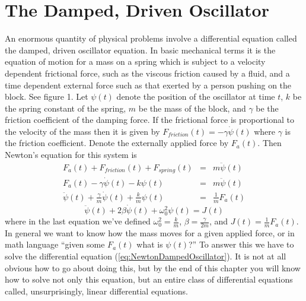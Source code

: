 \section{The Damped, Driven Oscillator}
An enormous quantity of physical problems involve a differential equation called the damped, driven oscillator equation.  In basic mechanical terms it is the equation of motion for a mass on a spring which is subject to a velocity dependent frictional force, such as the viscous friction caused by a fluid, and a time dependent external force such as that exerted by a person pushing on the block.  See figure 1.  Let $\psi(t)$ denote the position of the oscillator at time $t$, $k$ be the spring constant of the spring, $m$ be the mass of the block, and $\gamma$ be the friction coefficient of the damping force.  If the frictional force is proportional to the velocity of the mass then it is given by $F_{friction}(t) = -\gamma \dot{\psi}(t)$ where $\gamma$ is the friction coefficient.  Denote the externally applied force by $F_a(t)$.  Then Newton's equation for this system is
\begin{eqnarray*}
F_a(t) + F_{friction}(t) + F_{spring}(t) &=& m \ddot{\psi}(t)\\
F_a(t) - \gamma \dot{\psi}(t) - k\psi (t) &=& m \ddot{\psi}(t)\\
\ddot{\psi}(t) + \frac{\gamma}{m}\dot{\psi}(t) + \frac{k}{m}\psi (t) &=& \frac{1}{m}F_a(t)
\end{eqnarray*}
\begin{equation}\label{eq:NewtonDampedOscillator}
\ddot{\psi}(t) + 2\beta\dot{\psi}(t) + \omega ^2_0 \psi(t) = J(t)
\end{equation}
where in the last equation we've defined $\omega^2_0 = \frac{k}{m}$, $\beta = \frac{\gamma}{2m}$, and $J(t) = \frac{1}{m}F_a(t)$.  In general we want to know how the mass moves for a given applied force, or in math language ``given some $F_a(t)$ what is $\psi(t)$?''  To answer this we have to solve the differential equation (\ref{eq:NewtonDampedOscillator}).  It is not at all obvious how to go about doing this, but by the end of this chapter you will know how to solve not only this equation, but an entire class of differential equations called, unsurprisingly, linear differential equations.